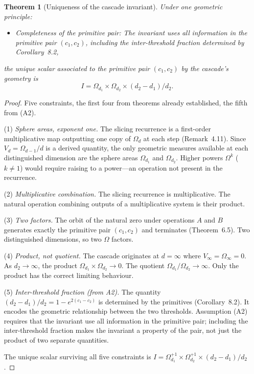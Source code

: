 \documentclass[11pt,a4paper]{article}
\newtheorem{theorem}{Theorem}[section]
\begin{document}
\begin{theorem}[Uniqueness of the cascade invariant]
Under one geometric principle:
\begin{itemize}
\item[(A2)] \textit{Completeness of the primitive pair:} The invariant uses all information in the primitive pair $(c_1, c_2)$, including the inter-threshold fraction determined by Corollary~8.2,
\end{itemize}
the unique scalar associated to the primitive pair $(c_1, c_2)$ by the cascade's geometry is
\[
I = \Omega_{d_1}\times\Omega_{d_2}\times(d_2-d_1)/d_2.
\]
\end{theorem}

\begin{proof}
Five constraints, the first four from theorems already established, the fifth from (A2).

(1) \textit{Sphere areas, exponent one.} The slicing recurrence is a first-order multiplicative map outputting one copy of $\Omega_d$ at each step (Remark~4.11). Since $V_d = \Omega_{d-1}/d$ is a derived quantity, the only geometric measures available at each distinguished dimension are the sphere areas $\Omega_{d_1}$ and $\Omega_{d_2}$. Higher powers $\Omega^k$ ($k\neq 1$) would require raising to a power---an operation not present in the recurrence.

(2) \textit{Multiplicative combination.} The slicing recurrence is multiplicative. The natural operation combining outputs of a multiplicative system is their product.

(3) \textit{Two factors.} The orbit of the natural zero under operations $A$ and $B$ generates exactly the primitive pair $(c_1, c_2)$ and terminates (Theorem~6.5). Two distinguished dimensions, so two $\Omega$ factors.

(4) \textit{Product, not quotient.} The cascade originates at $d=\infty$ where $V_\infty = \Omega_\infty = 0$. As $d_2\to\infty$, the product $\Omega_{d_1}\times\Omega_{d_2}\to 0$. The quotient $\Omega_{d_1}/\Omega_{d_2}\to\infty$. Only the product has the correct limiting behaviour.

(5) \textit{Inter-threshold fraction (from A2).} The quantity $(d_2-d_1)/d_2 = 1-e^{2(c_1-c_2)}$ is determined by the primitives (Corollary~8.2). It encodes the geometric relationship between the two thresholds. Assumption (A2) requires that the invariant use all information in the primitive pair; including the inter-threshold fraction makes the invariant a property of the pair, not just the product of two separate quantities.

The unique scalar surviving all five constraints is $I = \Omega^{+1}_{d_1}\times\Omega^{+1}_{d_2}\times(d_2-d_1)/d_2$.
\end{proof}
\end{document}
